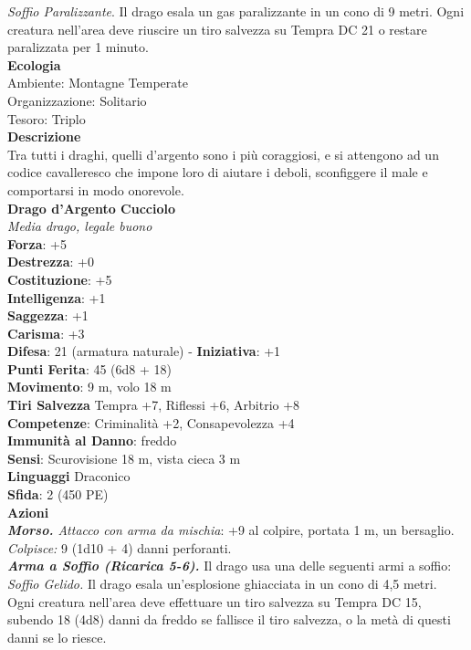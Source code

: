 \begin{multicols}{2}
\emph{Soffio Paralizzante}. Il drago esala un gas paralizzante in un cono di 9 metri. Ogni creatura nell'area deve riuscire un tiro salvezza su Tempra DC  21 o restare paralizzata per 1 minuto.\\
\textbf{Ecologia}\\
Ambiente: Montagne Temperate\\
Organizzazione: Solitario\\
Tesoro: Triplo\\
\textbf{Descrizione}\\
Tra tutti i draghi, quelli d’argento sono i più coraggiosi, e si attengono ad un codice cavalleresco che impone loro di aiutare i deboli, sconfiggere il male e comportarsi in modo onorevole.\\
\medskip\textbf{Drago d'Argento Cucciolo}\\
\emph{Media drago, legale buono}\\
\textbf{Forza}: +5\\
\textbf{Destrezza}: +0\\
\textbf{Costituzione}: +5\\
\textbf{Intelligenza}: +1\\
\textbf{Saggezza}: +1\\
\textbf{Carisma}: +3\\
\textbf{Difesa}: 21 (armatura naturale) - \textbf{Iniziativa}: +1\\
\textbf{Punti Ferita}: 45 (6d8 + 18)\\
\textbf{Movimento}: 9 m, volo 18 m\\
\textbf{Tiri Salvezza} Tempra +7, Riflessi +6, Arbitrio +8\\
\textbf{Competenze}: Criminalità +2, Consapevolezza +4\\
\textbf{Immunità al Danno}: freddo\\
\textbf{Sensi}: Scurovisione 18 m, vista cieca 3 m\\
\textbf{Linguaggi} Draconico\\
\textbf{Sfida}: 2 (450 PE)\smallskip\\
\smallskip\textbf{Azioni}\\
\emph{\textbf{Morso.} Attacco con arma da mischia}: +9 al colpire, portata 1 m, un bersaglio.\\
\emph{Colpisce:} 9 (1d10 + 4) danni perforanti.\\
\emph{\textbf{Arma a Soffio (Ricarica 5-6).}} Il drago usa una delle seguenti armi a soffio:\\
\emph{Soffio Gelido.} Il drago esala un'esplosione ghiacciata in un cono di 4,5 metri. Ogni creatura nell'area deve effettuare un tiro salvezza su Tempra DC  15, subendo 18 (4d8) danni da freddo se fallisce il tiro salvezza, o la metà di questi danni se lo riesce.\\

\end{multicols}
